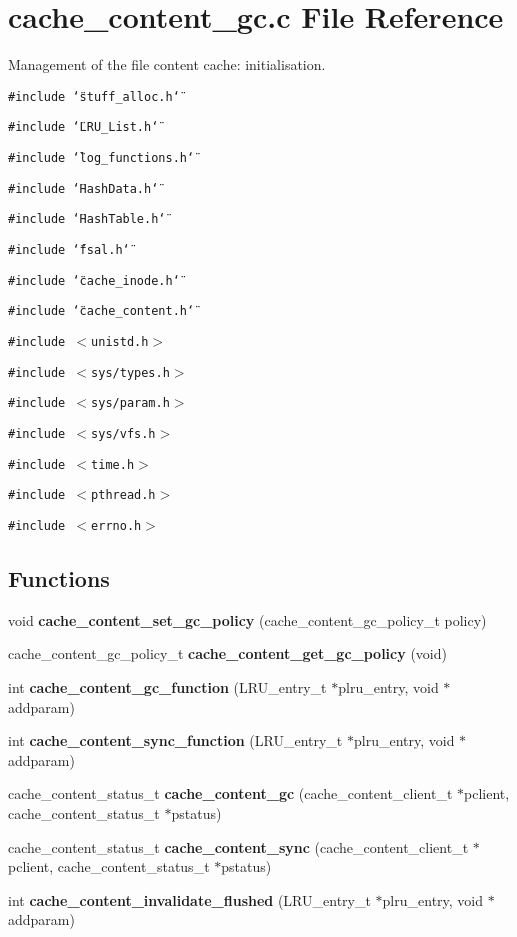 \section{cache\_\-content\_\-gc.c File Reference}
\label{cache__content__gc_8c}
Management of the file content cache: initialisation. 

{\tt \#include \char`\"{}stuff\_\-alloc.h\char`\"{}}\par
{\tt \#include \char`\"{}LRU\_\-List.h\char`\"{}}\par
{\tt \#include \char`\"{}log\_\-functions.h\char`\"{}}\par
{\tt \#include \char`\"{}Hash\-Data.h\char`\"{}}\par
{\tt \#include \char`\"{}Hash\-Table.h\char`\"{}}\par
{\tt \#include \char`\"{}fsal.h\char`\"{}}\par
{\tt \#include \char`\"{}cache\_\-inode.h\char`\"{}}\par
{\tt \#include \char`\"{}cache\_\-content.h\char`\"{}}\par
{\tt \#include $<$unistd.h$>$}\par
{\tt \#include $<$sys/types.h$>$}\par
{\tt \#include $<$sys/param.h$>$}\par
{\tt \#include $<$sys/vfs.h$>$}\par
{\tt \#include $<$time.h$>$}\par
{\tt \#include $<$pthread.h$>$}\par
{\tt \#include $<$errno.h$>$}\par
\subsection*{Functions}
\begin{CompactItemize}
\item 
void {\bf cache\_\-content\_\-set\_\-gc\_\-policy} (cache\_\-content\_\-gc\_\-policy\_\-t policy)
\item 
cache\_\-content\_\-gc\_\-policy\_\-t {\bf cache\_\-content\_\-get\_\-gc\_\-policy} (void)
\item 
int {\bf cache\_\-content\_\-gc\_\-function} (LRU\_\-entry\_\-t $\ast$plru\_\-entry, void $\ast$addparam)
\item 
int {\bf cache\_\-content\_\-sync\_\-function} (LRU\_\-entry\_\-t $\ast$plru\_\-entry, void $\ast$addparam)
\item 
cache\_\-content\_\-status\_\-t {\bf cache\_\-content\_\-gc} (cache\_\-content\_\-client\_\-t $\ast$pclient, cache\_\-content\_\-status\_\-t $\ast$pstatus)
\item 
cache\_\-content\_\-status\_\-t {\bf cache\_\-content\_\-sync} (cache\_\-content\_\-client\_\-t $\ast$pclient, cache\_\-content\_\-status\_\-t $\ast$pstatus)
\item 
int {\bf cache\_\-content\_\-invalidate\_\-flushed} (LRU\_\-entry\_\-t $\ast$plru\_\-entry, void $\ast$addparam)
\end{CompactItemize}
